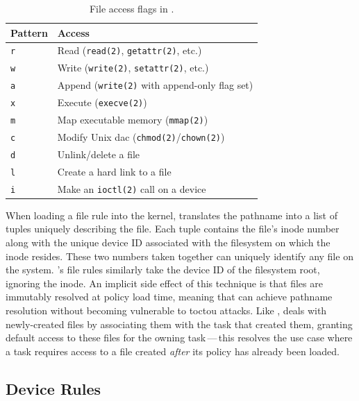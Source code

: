 \begin{table}[htbp]
  \centering
  \caption[File access flags in \bpfcontain{}]{
    File access flags in \bpfcontain{}.
  }%
  \label{tab:bpfcontain-file-access}
  \begin{tabular}{ll}
  \toprule
  Pattern & Access \\
  \midrule
  \texttt{r} & Read (\texttt{read(2)}, \texttt{getattr(2)}, etc.) \\
  \texttt{w} & Write (\texttt{write(2)}, \texttt{setattr(2)}, etc.)\\
  \texttt{a} & Append (\texttt{write(2)} with append-only flag set) \\
  \texttt{x} & Execute (\texttt{execve(2)})\\
  \texttt{m} & Map executable memory (\texttt{mmap(2)}) \\
  \texttt{c} & Modify Unix \gls{dac} (\texttt{chmod(2)}/\texttt{chown(2)}) \\
  \texttt{d} & Unlink/delete a file \\
  \texttt{l} & Create a hard link to a file \\
  \texttt{i} & Make an \texttt{ioctl(2)} call on a device \\
  \bottomrule
  \end{tabular}
\end{table}

When loading a file rule into the kernel, \bpfcontain{} translates the pathname into
a list of tuples uniquely describing the file. Each tuple contains the file's inode number
along with the unique device ID associated with the filesystem on which the inode resides.
These two numbers taken together can uniquely identify any file on the system.
\bpfcontain{}'s file rules similarly take the device ID of the filesystem root, ignoring
the inode. An implicit side effect of this technique is that files are immutably resolved
at policy load time, meaning that \bpfcontain{} can achieve pathname resolution without
becoming vulnerable to \gls{toctou} attacks. Like \bpfbox{}, \bpfcontain{} deals with
newly-created files by associating them with the task that created them, granting default
access to these files for the owning task\,---\,this resolves the use case where a task
requires access to a file created \textit{after} its policy has already been loaded.

\subsection{Device Rules}


